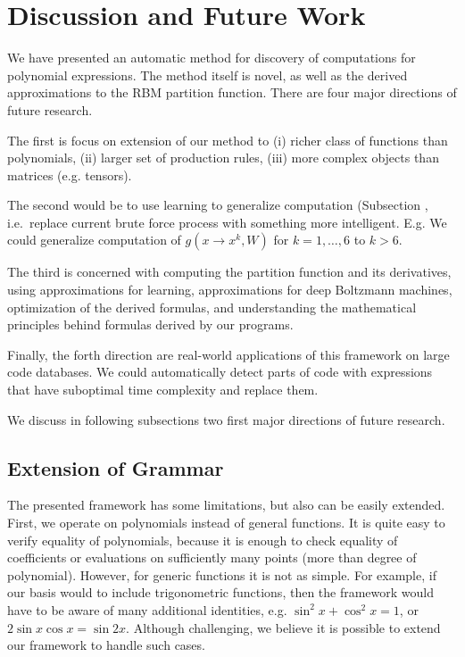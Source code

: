 \section{Discussion and Future Work}

We have presented an automatic method for discovery of computations for
 polynomial expressions. The method itself is novel, as well as the derived
approximations to the RBM partition function. There are four
major directions of future research. 


The first is focus on extension of our method
to (i) richer class of functions than polynomials, (ii) larger set of production
rules, (iii) more complex objects than matrices (e.g. tensors).


The second would be to use learning to
generalize computation (Subsection \label{agenda)}, i.e.~replace current brute force process with
something more intelligent. E.g. We could generalize computation of
$g(x \rightarrow x^k, W)$ for $k = 1, \dots, 6$ to $k > 6$. 


The third is concerned with computing
the partition function and its derivatives, using approximations for
learning, approximations for deep Boltzmann machines, optimization of
the derived formulas, and understanding the mathematical principles behind
formulas derived by our programs. 


Finally,
the forth direction are real-world applications of this framework on
large code databases. We could automatically detect parts of code with
expressions that have suboptimal time complexity and replace them.


We discuss in following subsections two first major directions of future research.


\subsection{Extension of Grammar}
The presented framework has some limitations, but also can be easily extended. First,
we operate on polynomials instead of general functions. It is quite easy to verify
equality of polynomials, because it is enough to check equality of coefficients or
evaluations on sufficiently many points (more than degree of
polynomial). However, for generic functions
it is not as simple. For example, if our basis would to include trigonometric functions, then the
framework would have to be aware of many additional identities,
e.g. $\sin^2{x} + \cos^2{x} = 1$, or $2\sin x \cos x = \sin
2x$. Although challenging, we believe it is possible to extend our
framework to handle such cases. 

